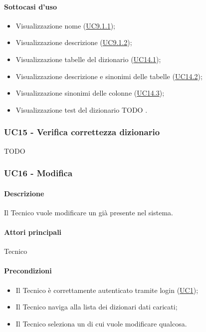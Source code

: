 \paragraph*{Sottocasi d'uso}
\begin{itemize}
  \item Visualizzazione nome  (\hyperref[UC9point1point1]{UC9.1.1});
  \item Visualizzazione descrizione  (\hyperref[UC9point1point2]{UC9.1.2});
  \item Visualizzazione tabelle del dizionario (\hyperref[UC14point1]{UC14.1});
  \item Visualizzazione descrizione e sinonimi delle tabelle (\hyperref[UC14point2]{UC14.2});
  \item Visualizzazione sinonimi delle colonne (\hyperref[UC14point3]{UC14.3});
  \item Visualizzazione test del dizionario TODO .  
\end{itemize}

\subsubsection{UC15 - Verifica correttezza dizionario}\label{UC15}
TODO


\subsubsection{UC16 - Modifica }\label{UC16}
\paragraph*{Descrizione} Il Tecnico vuole modificare un  già presente nel sistema.

\paragraph*{Attori principali} Tecnico

\paragraph*{Precondizioni}
\begin{itemize}
  \item Il Tecnico è correttamente autenticato tramite login (\hyperref[UC1]{UC1});
  \item Il Tecnico naviga alla lista dei dizionari dati caricati;
  \item Il Tecnico seleziona un  di cui vuole modificare qualcosa.  
\end{itemize}

